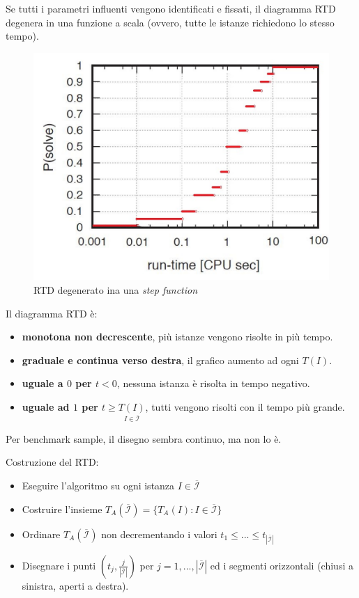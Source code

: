 \documentclass{article}
\begin{document}
Se tutti i parametri influenti vengono identificati e fissati, il diagramma RTD degenera
in una funzione a scala (ovvero, tutte le istanze richiedono lo stesso tempo).
\begin{figure}[H]
    \centering
    \includegraphics[scale=0.4]{images/RTD_stairs.png}
    \caption{RTD degenerato ina una \textit{step function}}
\end{figure}
Il diagramma RTD è:
\begin{itemize}
    \item \textbf{monotona non decrescente}, più istanze vengono risolte in più tempo.
    \item \textbf{graduale e continua verso destra}, il grafico aumento ad ogni $T(I)$.
    \item \textbf{uguale a $0$ per $t<0$}, nessuna istanza è risolta in tempo negativo.
    \item \textbf{uguale ad $1$ per $t\geq\underset{I\in\overline{\mathcal{I}}}{T(I)}$}, tutti vengono risolti con il tempo più grande.
\end{itemize}
Per benchmark sample, il disegno sembra continuo, ma non lo è.

Costruzione del RTD:
\begin{itemize}
    \item Eseguire l'algoritmo su ogni istanza $I\in\overline{\mathcal{I}}$
    \item Costruire l'insieme $T_A(\overline{\mathcal{I}})=\{T_A(I):I\in\overline{\mathcal{I}}\}$
    \item Ordinare $T_A(\overline{\mathcal{I}})$ non decrementando i valori $t_1 \leq ...\leq t_{|\overline{\mathcal{I}}|}$
    \item Disegnare i punti $\left(t_j,\frac{j}{|\overline{\mathcal{I}}|}\right)$ per $j=1,...,|\overline{\mathcal{I}}|$ ed
          i segmenti orizzontali (chiusi a sinistra, aperti a destra).
\end{itemize}
\end{document}
